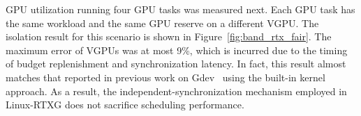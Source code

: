 GPU utilization running four GPU tasks was measured next.
Each GPU task has the same workload and the same GPU reserve on a different VGPU.
The isolation result for this scenario is shown in Figure~\ref{fig:band_rtx_fair}.
The maximum error of VGPUs was at most 9\%, which is incurred due to the timing of budget replenishment and synchronization latency.
In fact, this result almost matches that reported in previous work on Gdev~\cite{kato:gdev} using the built-in kernel approach.
As a result, the independent-synchronization mechanism employed in Linux-RTXG does not sacrifice scheduling performance.


\begin{figure}[!t]
\begin{minipage}[t]{0.33\hsize}
\begin{center}
\label{fig:real-null_null}
\label{fig:real-prio_null}
\end{center}
\end{minipage}
\begin{minipage}[t]{0.33\hsize}
\begin{center}

\end{center}
\end{minipage}
\end{figure}
